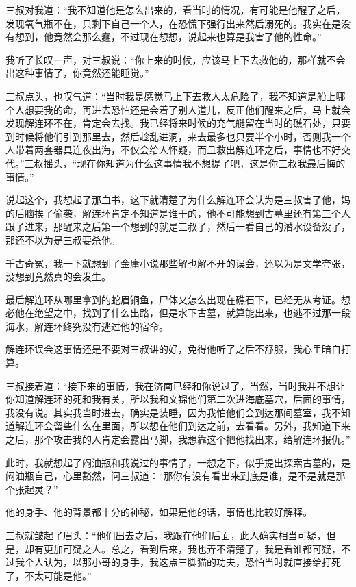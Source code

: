 三叔对我道：“我不知道他是怎么出来的，看当时的情况，有可能是他醒了之后，发现氧气瓶不在，只剩下自己一个人，在恐慌下强行出来然后溺死的。我实在是没有想到，他竟然会那么蠢，不过现在想想，说起来也算是我害了他的性命。”

我听了长叹一声，对三叔说：“你上来的时候，应该马上下去救他的，那样就不会出这种事情了，你竟然还能睡觉。”

三叔点头，也叹气道：“当时我是感觉马上下去救人太危险了，我不知道是船上哪个人想要我的命，再进去恐怕还是会着了别人道儿，反正他们醒来之后，马上就会发现解连环不在，肯定会去找。我已经将来时候的充气艇留在当时的礁石处，只要到时候将他们引到那里去，然后趁乱进洞，来去最多也只要半个小时，否则我一个人带着两套器具连夜出海，不仅会给人怀疑，而且救出解连环之后，事情也不好交代。”三叔摇头，“现在你知道为什么这事情我不想提了吧，这是你三叔我最后悔的事情。”

说起这个，我想起了那血书，这下就清楚了为什么解连环会认为是三叔害了他，妈的后脑挨了偷袭，解连环肯定不知道是谁干的，他不可能想到古墓里还有第三个人跟了进来，那醒来之后第一个想到的就是三叔了，然后一看自己的潜水设备没了，那还不以为是三叔要杀他。

千古奇冤，我一下就想到了金庸小说那些解也解不开的误会，还以为是文学夸张，没想到竟然真的会发生。

最后解连环从哪里拿到的蛇眉铜鱼，尸体又怎么出现在礁石下，已经无从考证。想必他在绝望之中，找到了什么出路，但是水下古墓，就算能出来，也逃不过那一段海水，解连环终究没有逃过他的宿命。

解连环误会这事情还是不要对三叔讲的好，免得他听了之后不舒服，我心里暗自打算。

三叔接着道：“接下来的事情，我在济南已经和你说过了，当然，当时我并不想让你知道解连环的死和我有关，所以我和文锦他们第二次进海底墓穴，后面的事情，我没有说。其实我当时进去，确实是装睡，因为我怕他们会到达那间墓室，我不知道解连环会留些什么在里面，所以想在他们到达之前，去看看。另外，我知道下来之后，那个攻击我的人肯定会露出马脚，我想靠这个把他找出来，给解连环报仇。”

此时，我就想起了闷油瓶和我说过的事情了，一想之下，似乎提出探索古墓的，是闷油瓶自己，心里豁然，问三叔道：“那你有没有看出来到底是谁，是不是就是那个张起灵？”

他的身手、他的背景都十分的神秘，如果是他的话，事情也比较好解释。

三叔就皱起了眉头：“他们出去之后，我跟在他们后面，此人确实相当可疑，但是，却有更加可疑之人。总之，看到后来，我也弄不清楚了，我是看谁都可疑，不过我个人认为，以那小哥的身手，我这点三脚猫的功夫，恐怕当时就直接给打死了，不太可能是他。”

